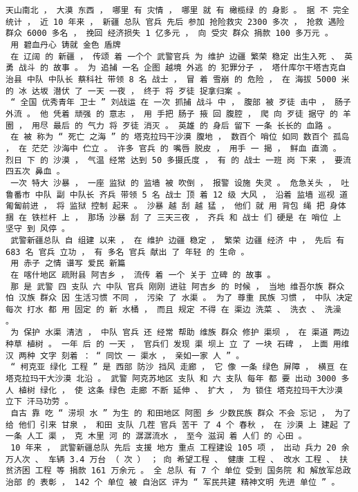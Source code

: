 \documentclass{article}
\begin{document}
\begin{Verbatim}[commandchars=\\\{\}]
 天山南北 ， 大漠 东西 ， 哪里 有 灾情 ， 哪里 就 有 橄榄绿 的 身影 。 据 不 完全 统计 ， 近 10 年来 ， 新疆 总队 官兵 先后 参加 抢险救灾 2300 多次 ， 抢救 遇险 群众 6000 多名 ， 挽回 经济损失 1 亿多元 ， 向 受灾 群众 捐款 100 多万元 。 
 用 碧血丹心 铸就 金色 盾牌 
 在 辽阔 的 新疆 ， 传颂 着 一个个 武警官兵 为 维护 边疆 繁荣 稳定 出生入死 、 英勇 战斗 的 故事 。 为 追捕 一名 企图 越境 外逃 的 犯罪分子 ， 塔什库尔干塔吉克自治县 中队 中队长 蔡科社 带领 8 名 战士 ， 冒 着 雪崩 的 危险 ， 在 海拔 5000 米 的 冰 达坂 潜伏 了 一天 一夜 ， 终于 将 歹徒 捉拿归案 。 
 “ 全国 优秀青年 卫士 ” 刘战运 在 一次 抓捕 战斗 中 ， 腹部 被 歹徒 击中 ， 肠子 外流 。 他 凭着 顽强 的 意志 ， 用 手把 肠子 掖 回 腹腔 ， 爬 向 歹徒 据守 的 羊圈 ， 用尽 最后 的 气力 将 歹徒 消灭 。 英雄 的 身后 留下 一条 长长的 血路 。 
 在 被 称为 “ 死亡 之海 ” 的 塔克拉玛干沙漠 腹地 ， 数百个 哨位 如同 数百个 孤岛 ， 在 茫茫 沙海中 伫立 。 许多 官兵 的 嘴唇 脱皮 ， 用手 一 揭 ， 鲜血 直滴 。 烈日 下 的 沙漠 ， 气温 经常 达到 50 多摄氏度 ， 有 的 战士 一班 岗 下来 ， 要流 四五次 鼻血 。 
 一次 特大 沙暴 ， 一座 监狱 的 监墙 被 吹倒 ， 报警 设施 失灵 。 危急关头 ， 吐鲁番市 中队 副 中队长 齐兵 带领 5 名 战士 顶 着 12 级 大风 ， 沿着 监墙 巡视 道 匍匐前进 ， 将 监狱 控制 起来 。 沙暴 越 刮 越 猛 ， 他们 就 用 背包 绳 把 身体 捆 在 铁栏杆 上 ， 那场 沙暴 刮 了 三天三夜 ， 齐兵 和 战士 们 硬是 在 哨位 上 坚守 到 风停 。 
 武警新疆总队 自 组建 以来 ， 在 维护 边疆 稳定 ， 繁荣 边疆 经济 中 ， 先后 有 683 名 官兵 立功 ， 有 多名 官兵 献出 了 年轻 的 生命 。 
 用 赤子 之情 谱写 爱民 新篇 
 在 喀什地区 疏附县 阿吉乡 ， 流传 着 一个 关于 立碑 的 故事 。 
 那 是 武警 四 支队 六 中队 官兵 刚刚 进驻 阿吉乡 的 时候 ， 当地 维吾尔族 群众 怕 汉族 群众 因 生活习惯 不同 ， 污染 了 水渠 。 为了 尊重 民族 习惯 ， 中队 决定 每次 打水 都 用 固定 的 新 水桶 ， 而且 规定 不得 在 渠边 洗菜 、 洗衣 、 洗澡 。 
 为 保护 水渠 清洁 ， 中队 官兵 还 经常 帮助 维族 群众 修护 渠坝 ， 在 渠道 两边 种草 植树 。 一年 后 的 一天 ， 官兵们 发现 渠 坝上 立 了 一块 石碑 ， 上面 用维汉 两种 文字 刻着 ： “ 同饮 一 渠水 ， 亲如一家 人 ” 。 
 “ 柯克亚 绿化 工程 ” 是 西部 防沙 挡风 走廊 ， 它 像 一条 绿色 屏障 ， 横亘 在 塔克拉玛干大沙漠 北沿 。 武警 阿克苏地区 支队 和 六 支队 每年 都 要 出动 3000 多人 植树 绿化 ， 使 这条 绿色 走廊 不断 延伸 、 扩大 ， 为 锁住 塔克拉玛干大沙漠 立下 汗马功劳 。 
 自古 靠 吃 “ 涝坝 水 ” 为生 的 和田地区 阿图 乡 少数民族 群众 不会 忘记 ， 为了 给 他们 引来 甘泉 ， 和田 支队 几茬 官兵 苦干 了 4 个 春秋 ， 在 沙漠 上 建起 了 一条 人工 渠 ， 克 木里 河 的 潺潺流水 ， 至今 滋润 着 人们 的 心田 。 
 10 年来 ， 武警新疆总队 先后 支援 地方 重点 工程建设 105 项 ， 出动 兵力 20 余万人次 、 车辆 3.4 万台 （ 次 ） ； 向 希望工程 、 健康 工程 、 改水 工程 、 扶贫济困 工程 等 捐款 161 万余元 。 全 总队 有 7 个 单位 受到 国务院 和 解放军总政治部 的 表彰 ， 142 个 单位 被 自治区 评为 “ 军民共建 精神文明 先进 单位 ” 。 

\end{Verbatim}
\end{document}
